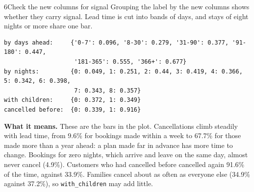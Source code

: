 \begin{labquestion}{6}{Check the new columns for signal}
Grouping the label by the new columns shows whether they carry signal. Lead time is cut into bands of days, and stays of eight nights or more share one bar.
\end{labquestion}
\begin{labanswer}

\begin{refoutput}
\begin{lstlisting}[style=utpterminal]
by days ahead:     {'0-7': 0.096, '8-30': 0.279, '31-90': 0.377, '91-180': 0.447,
                    '181-365': 0.555, '366+': 0.677}
by nights:         {0: 0.049, 1: 0.251, 2: 0.44, 3: 0.419, 4: 0.366, 5: 0.342, 6: 0.398,
                    7: 0.343, 8: 0.357}
with children:     {0: 0.372, 1: 0.349}
cancelled before:  {0: 0.339, 1: 0.916}
\end{lstlisting}
\end{refoutput}

\textbf{What it means.} These are the bars in the plot. Cancellations climb steadily with lead time, from 9.6\% for bookings made within a week to 67.7\% for those made more than a year ahead: a plan made far in advance has more time to change. Bookings for zero nights, which arrive and leave on the same day, almost never cancel (4.9\%). Customers who had cancelled before cancelled again 91.6\% of the time, against 33.9\%. Families cancel about as often as everyone else (34.9\% against 37.2\%), so \texttt{with\_children} may add little.
\end{labanswer}

